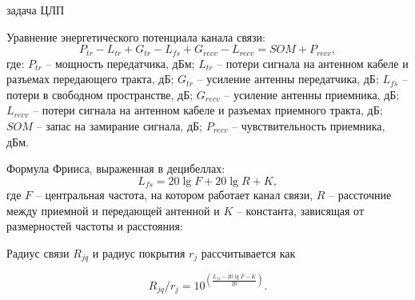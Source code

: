 \begin{frame}
    {задача ЦЛП}
    \begin{minipage}[t]{1\linewidth}
        \fontsize{8pt}{7.2}\selectfont
        \justifying
        Уравнение энергетического потенциала канала связи:
        $$
        P_{tr} - L_{tr} + G_{tr} - L_{fs} + G_{recv} - L_{recv} = SOM + P_{recv},
        $$
        где: $P_{tr}$ -- мощность передатчика, дБм; $L_{tr}$ -- потери сигнала на антенном кабеле и разъемах передающего тракта, дБ; $G_{tr}$ -- усиление антенны передатчика, дБ; $L_{fs}$ -- потери в свободном пространстве, дБ; $G_{recv}$ -- усиление антенны приемника, дБ; $L_{recv}$ -- потери сигнала на антенном кабеле и разъемах приемного тракта, дБ; $SOM$ -- запас на замирание сигнала, дБ; $P_{recv}$ -- чувствительность приемника, дБм.

        \bigskip
        Формула Фрииса, выраженная в децибеллах:
        $$
        \label{eq:part3_L_fs}
        L_{fs} = 20 \lg{F} + 20\lg{R} + K,
        $$
        где $F$ -- центральная частота, на котором работает канал связи, $R$ -- рассточние между приемной и передающей антенной и $K$ -- константа, зависящая от размерностей частоты и расстояния:
        
        \bigskip
        Радиус связи $R_{jq}$  и радиус покрытия $r_j$ рассчитывается как

        $$
        R_{jq} / r_j = 10^{\left(\frac{L_{fs} - 20\lg{F} - K}{20}\right)}.
        $$
    \end{minipage}

\end{frame}


